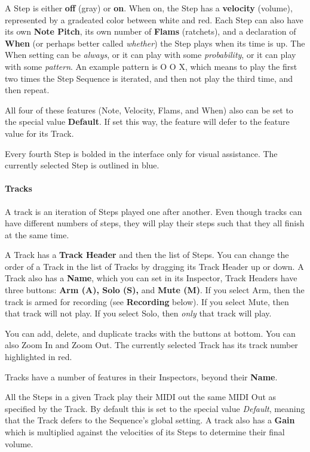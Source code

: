 \documentclass[twoside,10pt]{article}
\begin{document}
A Step is either {\bf off} (gray) or {\bf on}.  When on, the Step has a {\bf velocity} (volume), represented by a gradeated color between white and red.  Each Step can also have its own {\bf Note Pitch}, its own number of {\bf Flams} (ratchets), and a declaration of {\bf When} (or perhaps better called {\it whether}) the Step plays when its time is up.  The When setting can be {\it always}, or it can play with some {\it probability}, or it can play with some {\it pattern}.  An example pattern is \textsf{O O X}, which means to play the first two times the Step Sequence is iterated, and then not play the third time, and then repeat. 

All four of these features (Note, Velocity, Flams, and When) also can be set to the special value {\bf Default}.   If set this way, the feature will defer to the feature value for its Track.

Every fourth Step is bolded in the interface only for visual assistance.    The currently selected Step is outlined in blue.

\paragraph{Tracks}

A track is an iteration of Steps played one after another.  Even though tracks can have different numbers of steps, they will play their steps such that they all finish at the same time.

A Track has a {\bf Track Header} and then the list of Steps.  You can change the order of a Track in the list of Tracks by dragging its Track Header up or down.  A Track also has a {\bf Name}, which you can set in its Inspector,  Track Headers have three buttons: {\bf Arm (A), Solo (S),} and {\bf Mute (M)}.  If you select Arm, then the track is armed for recording (see {\bf Recording} below).   If you select Mute, then that track will not play.  If you select Solo, then {\it only} that track will play.

You can add, delete, and duplicate tracks with the buttons at bottom.  You can also Zoom In and Zoom Out.  The currently selected Track has its track number highlighted in red.

Tracks have a number of features in their Inspectors, beyond their {\bf Name}.

All the Steps in a given Track play their MIDI out the same MIDI Out as specified by the Track.  By default this is set to the special value {\it Default}, meaning that the Track defers to the Sequence's global setting.  A track also has a {\bf Gain} which is multiplied against the velocities of its Steps to determine their final volume.  
\end{document}
